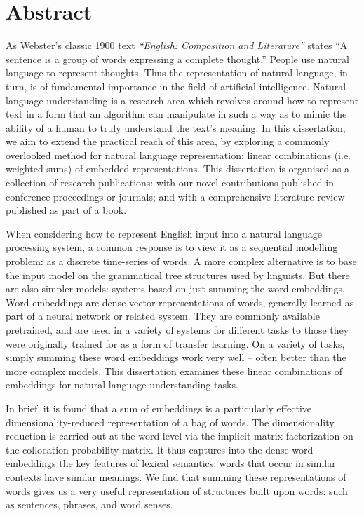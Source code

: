 \documentclass{book}
\begin{document}
\chapter*{Abstract}
As Webster's classic 1900 text \textit{``English: Composition and Literature''} states
``A sentence is a group of words expressing a complete thought.''
People use natural language to represent thoughts.
Thus the representation of natural language, in turn, is of fundamental importance in the field of artificial intelligence.
Natural language understanding is a research area which  revolves around how to represent text in a form that an algorithm can manipulate in such a way as to mimic the ability of a human to truly understand the text's meaning.
In this dissertation, we aim to extend the practical reach of this area,
by exploring a commonly overlooked method for natural language representation: linear combinations (i.e. weighted sums) of embedded representations.
This dissertation is organised as a collection of research publications:
 with our novel contributions published in conference proceedings or journals;
 and with a comprehensive literature review published as part of a book.

When considering how to represent English input into a natural language processing system,
a common response is to view it as a sequential modelling problem: as a discrete time-series of words.
A more complex alternative is to base the input model on the grammatical tree structures used by linguists.
But there are also simpler models: systems based on just summing the word embeddings.
Word embeddings are dense vector representations of words, generally learned as part of a neural network or related system.
They are commonly available pretrained, and are used in a variety of systems for different tasks to those they were originally trained for as a form of transfer learning.
On a variety of tasks, simply summing these word embeddings work very well -- often better than the more complex models.
This dissertation examines these linear combinations of embeddings for natural language understanding tasks.

In brief, it is found that a sum of embeddings is a particularly effective dimensionality-reduced representation of a bag of words.
The dimensionality reduction is carried out at the word level via the implicit matrix factorization 
on the collocation probability matrix.
It thus captures into the dense word embeddings the key features of lexical semantics:
words that occur in similar contexts have similar meanings.
We find that summing these representations of words gives us a very useful representation of structures built upon words: such as sentences, phrases, and word senses.
\end{document}
